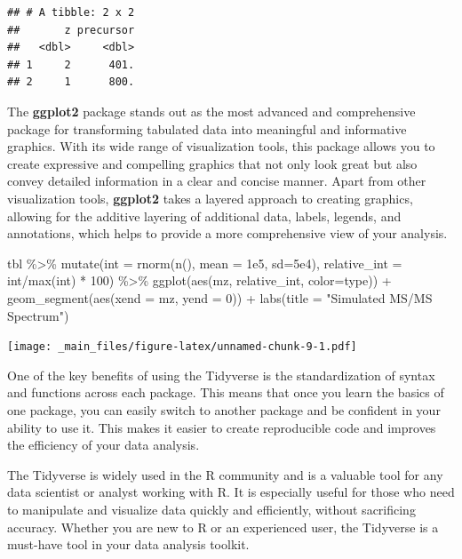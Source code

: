 \documentclass[
]{book}
\newenvironment{Shaded}{\begin{snugshade}}{\end{snugshade}}
\newcommand{\AttributeTok}[1]{\textcolor[rgb]{0.77,0.63,0.00}{#1}}
\newcommand{\DecValTok}[1]{\textcolor[rgb]{0.00,0.00,0.81}{#1}}
\newcommand{\FloatTok}[1]{\textcolor[rgb]{0.00,0.00,0.81}{#1}}
\newcommand{\FunctionTok}[1]{\textcolor[rgb]{0.00,0.00,0.00}{#1}}
\newcommand{\NormalTok}[1]{#1}
\newcommand{\SpecialCharTok}[1]{\textcolor[rgb]{0.00,0.00,0.00}{#1}}
\newcommand{\StringTok}[1]{\textcolor[rgb]{0.31,0.60,0.02}{#1}}
\begin{document}
\begin{verbatim}
## # A tibble: 2 x 2
##       z precursor
##   <dbl>     <dbl>
## 1     2      401.
## 2     1      800.
\end{verbatim}

The \textbf{ggplot2} package stands out as the most advanced and comprehensive package for transforming tabulated data into meaningful and informative graphics. With its wide range of visualization tools, this package allows you to create expressive and compelling graphics that not only look great but also convey detailed information in a clear and concise manner. Apart from other visualization tools, \textbf{ggplot2} takes a layered approach to creating graphics, allowing for the additive layering of additional data, labels, legends, and annotations, which helps to provide a more comprehensive view of your analysis.

\begin{Shaded}
\begin{Highlighting}[]
\NormalTok{tbl }\SpecialCharTok{\%\textgreater{}\%}
  \FunctionTok{mutate}\NormalTok{(}\AttributeTok{int =} \FunctionTok{rnorm}\NormalTok{(}\FunctionTok{n}\NormalTok{(), }\AttributeTok{mean =} \FloatTok{1e5}\NormalTok{, }\AttributeTok{sd=}\FloatTok{5e4}\NormalTok{),}
         \AttributeTok{relative\_int =}\NormalTok{ int}\SpecialCharTok{/}\FunctionTok{max}\NormalTok{(int) }\SpecialCharTok{*} \DecValTok{100}\NormalTok{) }\SpecialCharTok{\%\textgreater{}\%}
  \FunctionTok{ggplot}\NormalTok{(}\FunctionTok{aes}\NormalTok{(mz, relative\_int, }\AttributeTok{color=}\NormalTok{type)) }\SpecialCharTok{+}
  \FunctionTok{geom\_segment}\NormalTok{(}\FunctionTok{aes}\NormalTok{(}\AttributeTok{xend =}\NormalTok{ mz, }\AttributeTok{yend =} \DecValTok{0}\NormalTok{)) }\SpecialCharTok{+}
  \FunctionTok{labs}\NormalTok{(}\AttributeTok{title =} \StringTok{"Simulated MS/MS Spectrum"}\NormalTok{)}
\end{Highlighting}
\end{Shaded}

\texttt{[image: \_main\_files/figure-latex/unnamed-chunk-9-1.pdf]}

One of the key benefits of using the Tidyverse is the standardization of syntax and functions across each package. This means that once you learn the basics of one package, you can easily switch to another package and be confident in your ability to use it. This makes it easier to create reproducible code and improves the efficiency of your data analysis.

The Tidyverse is widely used in the R community and is a valuable tool for any data scientist or analyst working with R. It is especially useful for those who need to manipulate and visualize data quickly and efficiently, without sacrificing accuracy. Whether you are new to R or an experienced user, the Tidyverse is a must-have tool in your data analysis toolkit.
\end{document}
